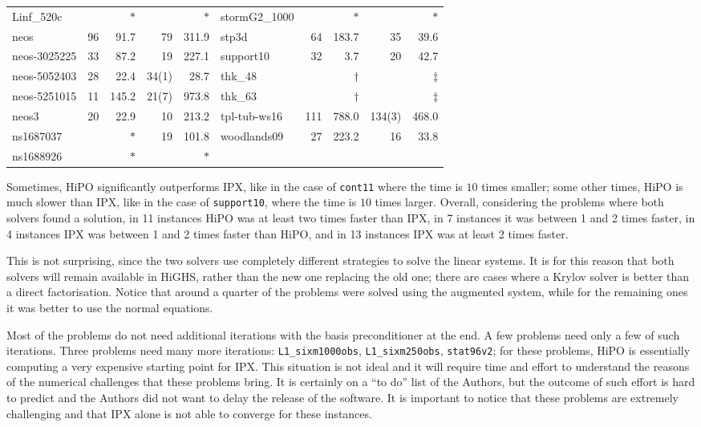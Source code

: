 \documentclass[a4paper]{article}
\newcommand{\0}{\mathbf 0}
\begin{document}
\begin{table}
\begin{tabular}{l|rr|rr||l|rr|rr}
Linf\_520c &  & $\ast$ &  & $\ast$ & stormG2\_1000 &  & $\ast$ &  & $\ast$ \\
neos & 96 & 91.7 & 79 & 311.9 & stp3d & 64 & 183.7 & 35 & 39.6 \\
neos-3025225 & 33 & 87.2 & 19 & 227.1 & support10 & 32 & 3.7 & 20 & 42.7 \\
neos-5052403 & 28 & 22.4 & 34(1) & 28.7 & thk\_48 &  & $\dagger$ &  & $\ddagger$\\
neos-5251015 & 11 & 145.2 & 21(7) & 973.8 & thk\_63 &  & $\dagger$ &  & $\ddagger$ \\
neos3 & 20 & 22.9 & 10 & 213.2 & tpl-tub-ws16 & 111 & 788.0 & 134(3) & 468.0 \\
ns1687037 &  & $\ast$ & 19 & 101.8 & woodlands09 & 27 & 223.2 & 16 & 33.8 \\
ns1688926 &  & $\ast$ &  & $\ast$  \\
\bottomrule
\end{tabular}
\end{table}

Sometimes, HiPO significantly outperforms IPX, like in the case of \texttt{cont11} where the time is $10$ times smaller; some other times, HiPO is much slower than IPX, like in the case of \texttt{support10}, where the time is $10$ times larger. Overall, considering the problems where both solvers found a solution, in 11 instances HiPO was at least two times faster than IPX, in 7 instances it was between 1 and 2 times faster, in 4 instances IPX was between 1 and 2 times faster than HiPO, and in 13 instances IPX was at least 2 times faster.


This is not surprising, since the two solvers use completely different strategies to solve the linear systems. It is for this reason that both solvers will remain available in HiGHS, rather than the new one replacing the old one; there are cases where a Krylov solver is better than a direct factorisation. Notice that around a quarter of the problems were solved using the augmented system, while for the remaining ones it was better to use the normal equations.

Most of the problems do not need additional iterations with the basis preconditioner at the end. A few problems need only a few of such iterations. Three problems need many more iterations: \texttt{L1\_sixm1000obs}, \texttt{L1\_sixm250obs}, \texttt{stat96v2}; for these problems, HiPO is essentially computing a very expensive starting point for IPX. This situation is not ideal and it will require time and effort to understand the reasons of the numerical challenges that these problems bring. It is certainly on a ``to do'' list of the Authors, but the outcome of such effort is hard to predict and the Authors did not want to delay the release of the software. 
It is important to notice that these problems are extremely challenging and that IPX alone is not able to converge for these instances.
\end{document}
